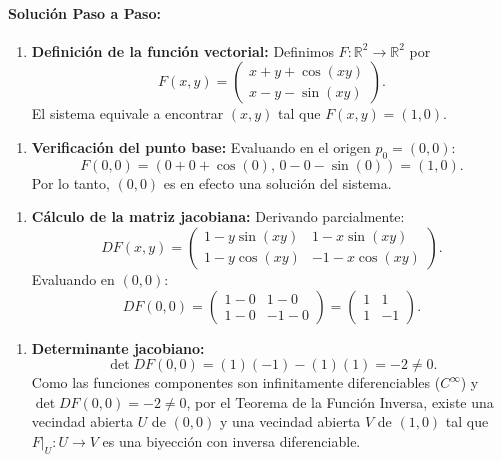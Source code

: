 \documentclass[11pt,a4paper]{article}
\begin{document}
\paragraph{Solución Paso a Paso:}\par
\begin{enumerate}[label=\textbf{\arabic*.}]
\item \textbf{Definición de la función vectorial:}
Definimos $F: \mathbb{R}^2 \to \mathbb{R}^2$ por
\begin{equation*}
F(x,y) = \begin{pmatrix} x + y + \cos(xy) \\ x - y - \sin(xy) \end{pmatrix}.
\end{equation*}
El sistema equivale a encontrar $(x,y)$ tal que $F(x,y) = (1,0)$.
\end{enumerate}

\begin{enumerate}[label=\textbf{\arabic*.}]
\item \textbf{Verificación del punto base:}
Evaluando en el origen $p_0 = (0,0)$:
\begin{equation*}
F(0,0) = (0 + 0 + \cos(0), \, 0 - 0 - \sin(0)) = (1, 0).
\end{equation*}
Por lo tanto, $(0,0)$ es en efecto una solución del sistema.
\end{enumerate}

\begin{enumerate}[label=\textbf{\arabic*.}]
\item \textbf{Cálculo de la matriz jacobiana:}
Derivando parcialmente:
\begin{equation*}
DF(x,y) = \begin{pmatrix} 1 - y\sin(xy) & 1 - x\sin(xy) \\ 1 - y\cos(xy) & -1 - x\cos(xy) \end{pmatrix}.
\end{equation*}
Evaluando en $(0,0)$:
\begin{equation*}
DF(0,0) = \begin{pmatrix} 1 - 0 & 1 - 0 \\ 1 - 0 & -1 - 0 \end{pmatrix} = \begin{pmatrix} 1 & 1 \\ 1 & -1 \end{pmatrix}.
\end{equation*}
\end{enumerate}

\begin{enumerate}[label=\textbf{\arabic*.}]
\item \textbf{Determinante jacobiano:}
\begin{equation*}
\det DF(0,0) = (1)(-1) - (1)(1) = -2 \neq 0.
\end{equation*}
Como las funciones componentes son infinitamente diferenciables ($C^\infty$) y $\det DF(0,0) = -2 \neq 0$, por el Teorema de la Función Inversa, existe una vecindad abierta $U$ de $(0,0)$ y una vecindad abierta $V$ de $(1,0)$ tal que $F|_U: U \to V$ es una biyección con inversa diferenciable.
\end{enumerate}
\end{document}
